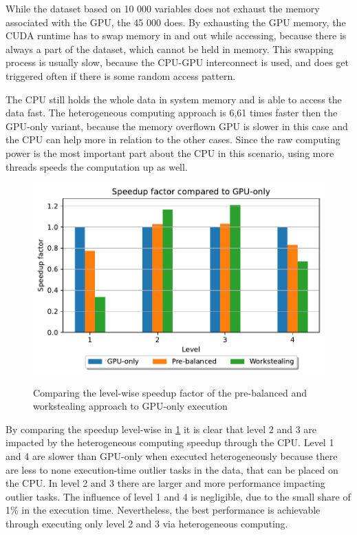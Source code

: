 While the dataset based on 10 000 variables does not exhaust the memory associated with the GPU, the 45 000 does. By exhausting the GPU memory, the CUDA runtime has to swap memory in and out while accessing, because there is always a part of the dataset, which cannot be held in memory. This swapping process is usually slow, because the CPU-GPU interconnect is used, and does get triggered often if there is some random access pattern.

The CPU still holds the whole data in system memory and is able to access the data fast. The heterogeneous computing approach is 6,61 times faster then the GPU-only variant, because the memory overflown GPU is slower in this case and the CPU can help more in relation to the other cases.
Since the raw computing power is the most important part about the CPU in this scenario, using more threads speeds the computation up as well.

\begin{figure}[H]
  \caption{Comparing the level-wise speedup factor of the pre-balanced and workstealing approach to GPU-only execution}
  \includegraphics[width=\textwidth]{figures/levelwise.pdf}
  \centering
  \label{fig:levelwise_delos}
\end{figure}

By comparing the speedup level-wise in \ref{fig:levelwise_delos} it is clear that level 2 and 3 are impacted by the heterogeneous computing speedup through the CPU. Level 1 and 4 are slower than GPU-only when executed heterogeneously because there are less to none execution-time outlier tasks in the data, that can be placed on the CPU. In level 2 and 3 there are larger and more performance impacting outlier tasks. The influence of level 1 and 4 is negligible, due to the small share of 1\% in the execution time. Nevertheless, the best performance is achievable through executing only level 2 and 3 via heterogeneous computing.

